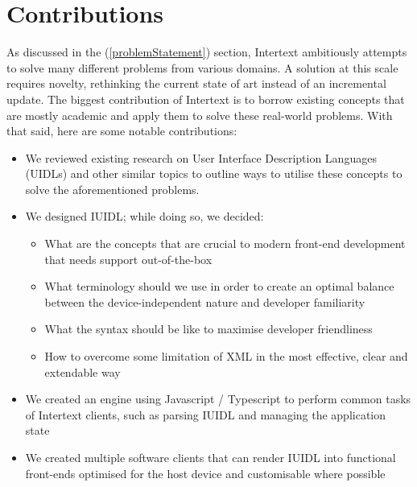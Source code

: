 
\section{Contributions}

As discussed in the  (\ref{problemStatement}) section, Intertext ambitiously attempts to solve many different problems from various domains. A solution at this scale requires novelty, rethinking the current state of art instead of an incremental update. The biggest contribution of Intertext is to borrow existing concepts that are mostly academic and apply them to solve these real-world problems. With that said, here are some notable contributions:

\begin{itemize}
  \item We reviewed existing research on User Interface Description Languages (UIDLs) and other similar topics to outline ways to utilise these concepts to solve the aforementioned problems.
  \item We designed IUIDL; while doing so, we decided:
  \begin{itemize}
    \item What are the concepts that are crucial to modern front-end development that needs support out-of-the-box
    \item What terminology should we use in order to create an optimal balance between the device-independent nature and developer familiarity
    \item What the syntax should be like to maximise developer friendliness
    \item How to overcome some limitation of XML in the most effective, clear and extendable way
  \end{itemize}
  \item We created an engine using Javascript / Typescript to perform common tasks of Intertext clients, such as parsing IUIDL and managing the application state
  \item We created multiple software clients that can render IUIDL into functional front-ends optimised for the host device and customisable where possible
\end{itemize}